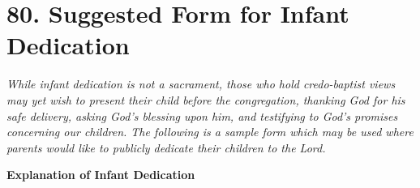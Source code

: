 \documentclass[
]{book}
\begin{document}
\hypertarget{suggested-form-for-infant-dedication}{%
\section*{80. Suggested Form for Infant Dedication}\label{suggested-form-for-infant-dedication}}

\protect\hypertarget{chapter-slug-80-suggested-form-for-infant-dedication}{\href{}{}}

\protect\hypertarget{80}{\href{}{}}\emph{While infant dedication is not a sacrament, those who hold credo-baptist views may yet wish to present their child before the congregation, thanking God for his safe delivery, asking God's blessing upon him, and testifying to God's promises concerning our children. The following is a sample form which may be used where parents would like to publicly dedicate their children to the Lord.}

\textbf{Explanation of Infant Dedication}
\end{document}
